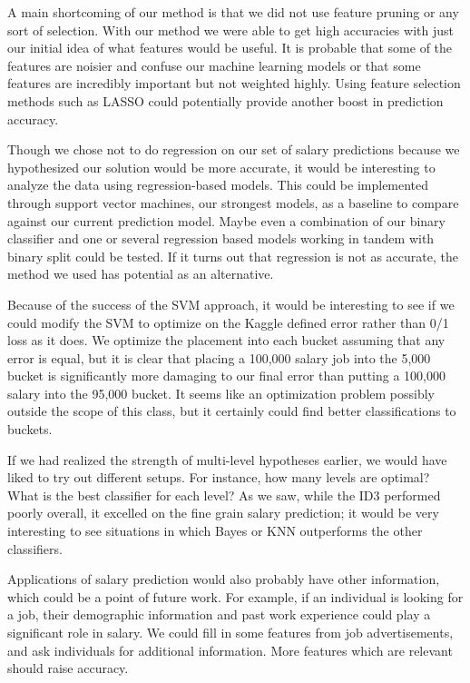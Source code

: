 \documentclass{pset}
\begin{document}
A main shortcoming of our method is that we did not use feature pruning or any
sort of selection. With our method we were able to get high accuracies with
just our initial idea of what features would be useful. It is probable that
some of the features are noisier and confuse our machine learning models or
that some features are incredibly important but not weighted highly. Using
feature selection methods such as LASSO could potentially provide another boost
in prediction accuracy.

Though we chose not to do regression on our set of salary predictions because
we hypothesized our solution would be more accurate, it would be interesting to
analyze the data using regression-based models. This could be implemented
through support vector machines, our strongest models, as a baseline to compare
against our current prediction model. Maybe even a combination of our binary
classifier and one or several regression based models working in tandem with
binary split could be tested. If it turns out that regression is not as
accurate, the method we used has potential as an alternative. 

Because of the success of the SVM approach, it would be interesting to see if
we could modify the SVM to optimize on the Kaggle defined error rather than 0/1
loss as it does. We optimize the placement into each bucket assuming that any
error is equal, but it is clear that placing a 100,000 salary job into the
5,000 bucket is significantly more damaging to our final error than putting a
100,000 salary into the 95,000 bucket. It seems like an optimization problem
possibly outside the scope of this class, but it certainly could find better
classifications to buckets. 

If we had realized the strength of multi-level hypotheses earlier, we would
have liked to try out different setups. For instance, how many levels are
optimal? What is the best classifier for each level? As we saw, while the ID3
performed poorly overall, it excelled on the fine grain salary prediction; it
would be very interesting to see situations in which Bayes or KNN outperforms
the other classifiers.

Applications of salary prediction would also probably have other information,
which could be a point of future work. For example, if an individual is looking
for a job, their demographic information and past work experience could play
a significant role in salary. We could fill in some features from job advertisements, and ask
individuals for additional information. More features which are relevant should
raise accuracy. 
\end{document}
